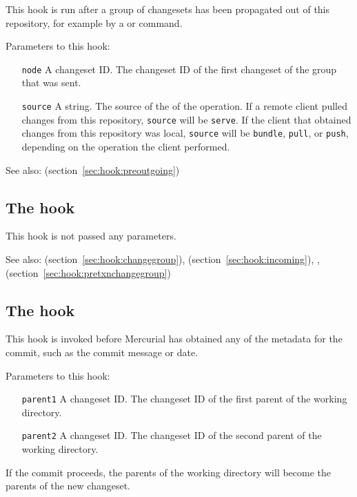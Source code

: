 This hook is run after a group of changesets has been propagated out
of this repository, for example by a  or 
command.

Parameters to this hook:
\begin{itemize}
\item[\texttt{node}] A changeset ID.  The changeset ID of the first
  changeset of the group that was sent.
\item[\texttt{source}] A string.  The source of the of the operation.
  If a remote client pulled changes from this repository,
  \texttt{source} will be \texttt{serve}.  If the client that obtained
  changes from this repository was local, \texttt{source} will be
  \texttt{bundle}, \texttt{pull}, or \texttt{push}, depending on the
  operation the client performed.
\end{itemize}

See also:  (section~\ref{sec:hook:preoutgoing})

\subsection{The  hook}
\label{sec:hook:prechangegroup}

This hook is not passed any parameters.

See also:  (section~\ref{sec:hook:changegroup}),
 (section~\ref{sec:hook:incoming}), ,
 (section~\ref{sec:hook:pretxnchangegroup})

\subsection{The  hook}
\label{sec:hook:precommit}

This hook is invoked before Mercurial has obtained any of the metadata
for the commit, such as the commit message or date.

Parameters to this hook:
\begin{itemize}
\item[\texttt{parent1}] A changeset ID.  The changeset ID of the first
  parent of the working directory.
\item[\texttt{parent2}] A changeset ID.  The changeset ID of the second
  parent of the working directory.
\end{itemize}
If the commit proceeds, the parents of the working directory will
become the parents of the new changeset.

